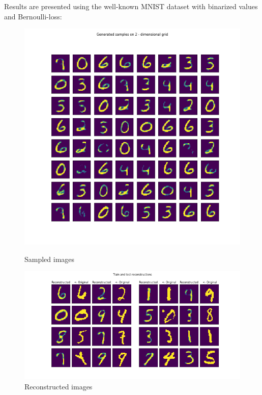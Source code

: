 \documentclass[12pt, english]{article}
\begin{document}
\vspace{4mm}

\par Results are presented using the well-known MNIST dataset with binarized values and Bernoulli-loss:

\vspace{4mm}

\begin{figure}[H] 
  \label{fig:auto_encoder_results} 
  \begin{minipage}{0.48\linewidth}
    \centering
    \includegraphics[width=.65\linewidth]{gen/generated_samples_mnist_auto_encoder.png} 
    \caption{Sampled images} 
  \end{minipage}\hfill
  \begin{minipage}{0.48\linewidth}
    \centering
    \includegraphics[width=.95\linewidth]{reco/reconstrunction_samples_mnist_auto_encoder.png} 
    \caption{Reconstructed images} 
  \end{minipage} 
\end{figure}

\vspace{4mm}
\end{document}
